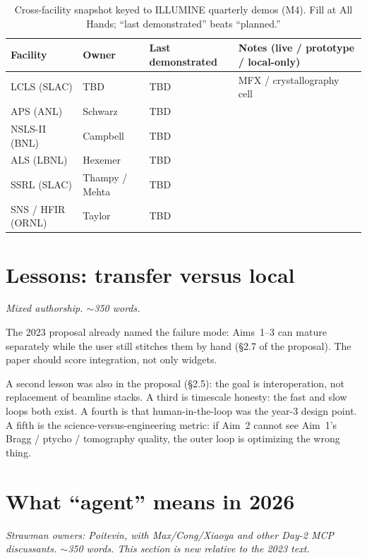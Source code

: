 \documentclass{iucrjournals}
\begin{document}
\begin{table}[t]
\centering
\caption{Cross-facility snapshot keyed to ILLUMINE quarterly demos (M4).
Fill at All Hands; ``last demonstrated'' beats ``planned.''}
\label{tab:m4}
\begin{tabular}{lllp{4.4cm}}
\toprule
Facility & Owner & Last demonstrated & Notes (live / prototype / local-only) \\
\midrule
LCLS (SLAC) & TBD & TBD & MFX / crystallography cell \\
APS (ANL) & Schwarz & TBD & \\
NSLS-II (BNL) & Campbell & TBD & \\
ALS (LBNL) & Hexemer & TBD & \\
SSRL (SLAC) & Thampy / Mehta & TBD & \\
SNS / HFIR (ORNL) & Taylor & TBD & \\
\bottomrule
\end{tabular}
\end{table}

\section{Lessons: transfer versus local}
\label{sec:lessons}

\textit{Mixed authorship. $\sim$350 words.}

The 2023 proposal already named the failure mode: Aims~1--3 can mature
separately while the user still stitches them by hand (\S2.7 of the proposal).
The paper should score integration, not only widgets.

A second lesson was also in the proposal (\S2.5): the goal is interoperation,
not replacement of beamline stacks. A third is timescale honesty: the fast and
slow loops both exist. A fourth is that human-in-the-loop was the year-3
design point. A fifth is the science-versus-engineering metric: if Aim~2 cannot
see Aim~1's Bragg / ptycho / tomography quality, the outer loop is optimizing
the wrong thing.

\section{What ``agent'' means in 2026}
\label{sec:agents}

\textit{Strawman owners: Poitevin, with Max/Cong/Xiaoya and other Day-2 MCP
discussants. $\sim$350 words. This section is new relative to the 2023 text.}
\end{document}

